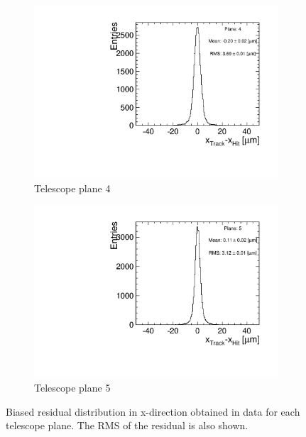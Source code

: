 \begin{figure}[htbp]
\begin{subfigure}[b]{0.3\textwidth}
    \includegraphics[width=\textwidth]{figures/Telescope/biasedResiduals/BiasedResiduals_run661_PlaneXRMS4.pdf}
    \caption{Telescope plane 4}
  \end{subfigure}\hfill
  \begin{subfigure}[b]{0.3\textwidth}
    \includegraphics[width=\textwidth]{figures/Telescope/biasedResiduals/BiasedResiduals_run661_PlaneXRMS5.pdf}
    \caption{Telescope plane 5}
  \end{subfigure}
  \caption{Biased residual distribution in x-direction obtained in
    data for each telescope plane. The RMS of the residual is also
    shown.}
  \label{fig:telescope_biasedResiduals_data_X}
\end{figure}

